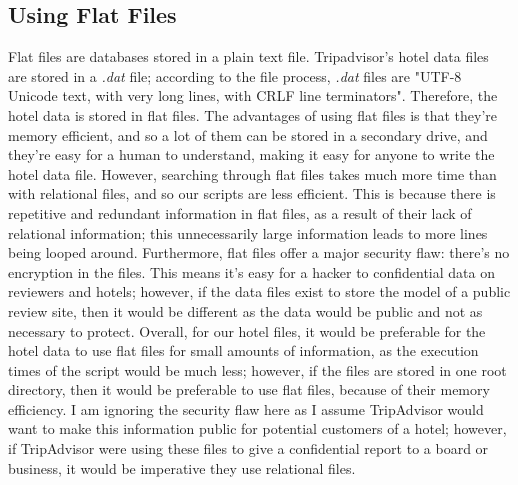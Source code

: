 \documentclass{article}
\begin{document}
	\subsection{Using Flat Files} \label{Flat Files}
	Flat files are databases stored in a plain text file. Tripadvisor's hotel data files are stored in a \textit{.dat} file; according to the file process, \textit{.dat} files are "UTF-8 Unicode text, with very long lines, with CRLF line terminators". Therefore, the hotel data is stored in flat files. \newline
	The advantages of using flat files is that they're memory efficient, and so a lot of them can be stored in a secondary drive, and they're easy for a human to understand, making it easy for anyone to write the hotel data file. \newline 
	However, searching through flat files takes much more time than with relational files, and so our scripts are less efficient. This is because there is repetitive and redundant information in flat files, as a result of their lack of relational information; this unnecessarily large information leads to more lines being looped around. 
	\newline
	Furthermore, flat files offer a major security flaw: there's no encryption in the files. This means it's easy for a hacker to confidential data on reviewers and hotels; however, if the data files exist to store the model of a public review site, then it would be different as the data would be public and not as necessary to protect. \newline
	\newline \newline
	Overall, for our hotel files, it would be preferable for the hotel data to use flat files for small amounts of information, as the execution times of the script would be much less; however, if the files are stored in one root directory, then it would be preferable to use flat files, because of their memory efficiency. \newline
	I am ignoring the security flaw here as I assume TripAdvisor would want to make this information public for potential customers of a hotel; however, if TripAdvisor were using these files to give a confidential report to a board or business, it would be imperative they use relational files. 
	
\end{document}
